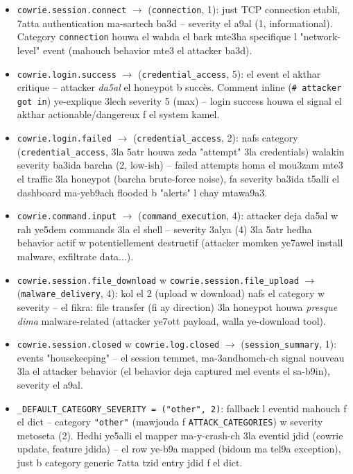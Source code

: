 \documentclass[11pt,a4paper]{report}
\DeclareRobustCommand{\code}[1]{\texttt{#1}}
\begin{document}
\begin{itemize}
  \item \code{cowrie.session.connect} $\to$ (\code{connection}, 1): just
        TCP connection etabli, 7atta authentication ma-sartech ba3d --
        severity el a9al (1, informational). Category \code{connection}
        houwa el wahda el bark mte3ha specifique l "network-level" event
        (mahouch behavior mte3 el attacker ba3d).
  \item \code{cowrie.login.success} $\to$ (\code{credential\_access}, 5):
        el event el akthar critique -- attacker \emph{da5al} el honeypot
        b succès. Comment inline (\code{\# attacker got in}) ye-explique
        3lech severity 5 (max) -- login success houwa el signal el akthar
        actionable/dangereux f el system kamel.
  \item \code{cowrie.login.failed} $\to$ (\code{credential\_access}, 2):
        nafs category (\code{credential\_access}, 3la 5atr houwa zeda
        "attempt" 3la credentials) walakin severity ba3ida barcha (2,
        low-ish) -- failed attempts homa el mou3zam mte3 el traffic 3la
        honeypot (barcha brute-force noise), fa severity ba3ida t5alli
        el dashboard ma-yeb9ach flooded b "alerts" l chay mtawa9a3.
  \item \code{cowrie.command.input} $\to$ (\code{command\_execution}, 4):
        attacker deja da5al w rah ye5dem commands 3la el shell -- severity
        3alya (4) 3la 5atr hedha behavior actif w potentiellement
        destructif (attacker momken ye7awel install malware, exfiltrate
        data...).
  \item \code{cowrie.session.file\_download} w \code{cowrie.session.file\_upload}
        $\to$ (\code{malware\_delivery}, 4): kol el 2 (upload w download)
        nafs el category w severity -- el fikra: file transfer (fi ay
        direction) 3la honeypot houwa \emph{presque dima} malware-related
        (attacker ye7ott payload, walla ye-download tool).
  \item \code{cowrie.session.closed} w \code{cowrie.log.closed} $\to$
        (\code{session\_summary}, 1): events "housekeeping" -- el session
        temmet, ma-3andhomch-ch signal nouveau 3la el attacker behavior
        (el behavior deja captured mel events el sa-b9in), severity el
        a9al.
  \item \code{\_DEFAULT\_CATEGORY\_SEVERITY = ("other", 2)}: fallback l
        eventid mahouch f el dict -- category \code{"other"} (mawjouda f
        \code{ATTACK\_CATEGORIES}) w severity metoseta (2). Hedhi ye5alli
        el mapper ma-y-crash-ch 3la eventid jdid (cowrie update, feature
        jdida) -- el row ye-b9a mapped (bidoun ma tel9a exception), just
        b category generic 7atta tzid entry jdid f el dict.
\end{itemize}
\end{document}
